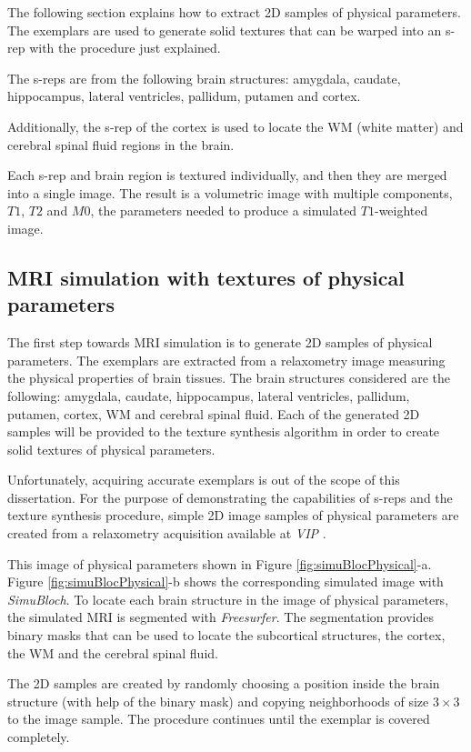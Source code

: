 The following section explains how to extract 2D samples of physical parameters.
The exemplars are used to generate solid textures that 
can be warped into an s-rep with the procedure just explained.

The s-reps are from the following brain structures:
amygdala, caudate, hippocampus, lateral ventricles, pallidum, putamen and cortex.

Additionally, the s-rep of the cortex is used to locate
the WM (white matter) and cerebral spinal fluid regions in the brain.

Each s-rep and brain region is textured individually,
and then they are merged into a single image. 
The result is a volumetric image with multiple components,
$T1$, $T2$ and $M0$, the parameters
needed to produce a simulated $T1$-weighted image.

\subsection{MRI simulation with textures of physical parameters}
\label{sec:simulationExperimentPhy}

The first step towards MRI simulation is to generate 2D samples of physical parameters.
The exemplars are extracted from a relaxometry image measuring 
the physical properties of brain tissues.
The brain structures considered are the following:
amygdala, caudate, hippocampus, lateral ventricles, pallidum, putamen, cortex, WM and cerebral spinal fluid.
Each of the generated 2D samples 
will be provided to the texture synthesis algorithm in order to create solid textures of physical parameters.

Unfortunately, acquiring accurate exemplars is out of the scope of this dissertation.
For the purpose of demonstrating the capabilities of s-reps and the texture synthesis procedure, 
simple 2D image samples of physical parameters are created from 
a relaxometry acquisition available at \textit{VIP} \cite{caom3}. 

This image of physical parameters shown in Figure \ref{fig:simuBlocPhysical}-a.
Figure \ref{fig:simuBlocPhysical}-b shows the corresponding simulated image with \textit{SimuBloch}.
To locate each brain structure in the image of physical parameters, 
the simulated MRI is segmented with \textit{Freesurfer}. 
The segmentation provides binary masks 
that can be used to locate the subcortical structures, the cortex, the WM and the cerebral spinal fluid.

The 2D samples are created by  
randomly choosing a position inside the brain structure (with help of the binary mask) and
copying neighborhoods of size $3\times3$ to the image sample. 
The procedure continues until the exemplar is covered completely.

